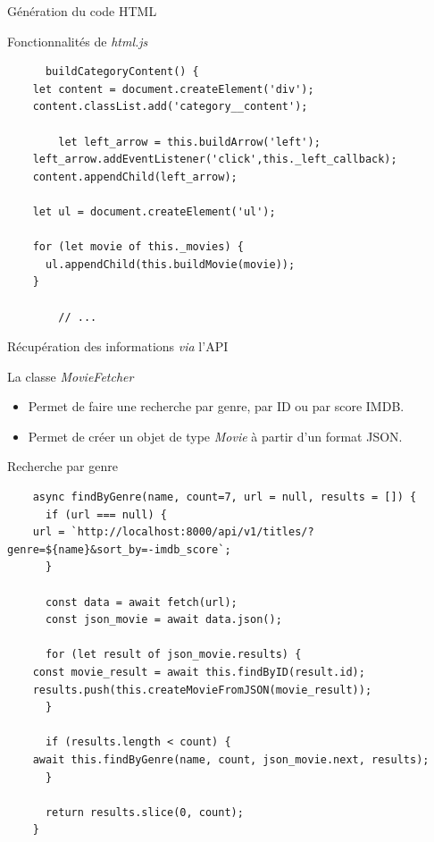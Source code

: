 \begin{frame}[fragile]{Génération du code HTML}
  \begin{block}{Fonctionnalités de \textit{html.js}}
    \tiny
    \begin{verbatim}
      buildCategoryContent() {
	let content = document.createElement('div');
	content.classList.add('category__content');

        let left_arrow = this.buildArrow('left');        
	left_arrow.addEventListener('click',this._left_callback);
	content.appendChild(left_arrow);
        
	let ul = document.createElement('ul');
        
	for (let movie of this._movies) {
	  ul.appendChild(this.buildMovie(movie));
	}

        // ...
    \end{verbatim}
  \end{block}
\end{frame}

\begin{frame}[fragile]{Récupération des informations \textit{via} l'API}
  \begin{block}{La classe \textit{MovieFetcher}}
    \begin{itemize}
    \item Permet de faire une recherche par genre, par ID ou par score IMDB. 
    \item Permet de créer un objet de type \textit{Movie} à partir
      d'un format JSON.
    \end{itemize}
  \end{block}

\end{frame}

\begin{frame}[fragile]{Recherche par genre}
  \tiny
  \begin{verbatim}
    async findByGenre(name, count=7, url = null, results = []) {
      if (url === null) {
	url = `http://localhost:8000/api/v1/titles/?genre=${name}&sort_by=-imdb_score`;
      }
      
      const data = await fetch(url);
      const json_movie = await data.json();

      for (let result of json_movie.results) {
	const movie_result = await this.findByID(result.id);
	results.push(this.createMovieFromJSON(movie_result));
      }

      if (results.length < count) {
	await this.findByGenre(name, count, json_movie.next, results);
      }
      
      return results.slice(0, count);
    }
  \end{verbatim}
\end{frame}


